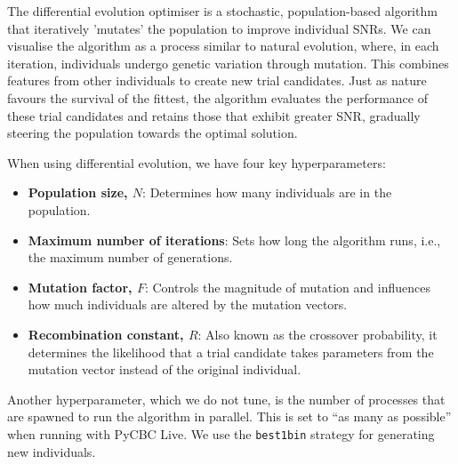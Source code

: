 The differential evolution optimiser is a stochastic, population-based algorithm that iteratively 'mutates' the population to improve individual SNRs. We can visualise the algorithm as a process similar to natural evolution, where, in each iteration, individuals undergo genetic variation through mutation. This combines features from other individuals to create new trial candidates. Just as nature favours the survival of the fittest, the algorithm evaluates the performance of these trial candidates and retains those that exhibit greater SNR, gradually steering the population towards the optimal solution.

When using differential evolution, we have four key hyperparameters:
%
\begin{itemize}
    \item \textbf{Population size, \( N \)}: Determines how many individuals are in the population.
    \item \textbf{Maximum number of iterations}: Sets how long the algorithm runs, i.e., the maximum number of generations.
    \item \textbf{Mutation factor, \( F \)}: Controls the magnitude of mutation and influences how much individuals are altered by the mutation vectors.
    \item \textbf{Recombination constant, \( R \)}: Also known as the crossover probability, it determines the likelihood that a trial candidate takes parameters from the mutation vector instead of the original individual.
\end{itemize}
%
Another hyperparameter, which we do not tune, is the number of processes that are spawned to run the algorithm in parallel. This is set to ``as many as possible'' when running with PyCBC Live. We use the \texttt{best1bin} strategy for generating new individuals.

